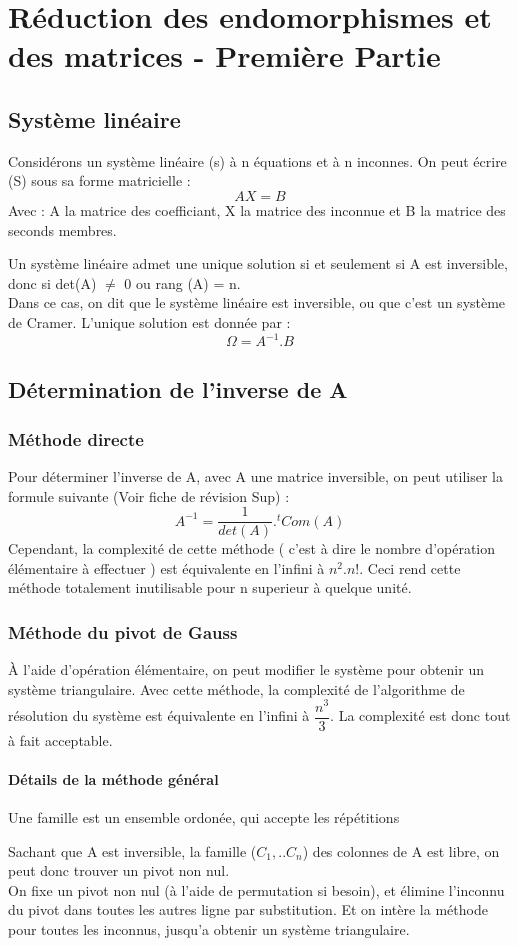 \chapter{Réduction des endomorphismes et des matrices - Première Partie}
\section{Système linéaire}
Considérons un système linéaire (s) à n équations et à n inconnes. On peut écrire (S) sous sa forme matricielle : 
$$AX = B$$
Avec : 
A la matrice des coefficiant, X la matrice des inconnue et B la matrice des seconds membres.\\
\begin{de}
Un système linéaire admet une unique solution si et seulement si A est inversible, donc si det(A) $\neq$ 0 ou rang (A) = n.\\
Dans ce cas, on dit que le système linéaire est inversible, ou que c'est un système de Cramer. L'unique solution est donnée par : 
$$\Omega = A^{-1}.B$$
\end{de}
\section{Détermination de l'inverse de A}
\subsection{Méthode directe}
Pour déterminer l'inverse de A, avec A une matrice inversible, on peut utiliser la formule suivante (Voir fiche de révision Sup) : 
$$A^{-1} = \dfrac{1}{det(A)}.^t Com(A)$$
Cependant, la complexité de cette méthode ( c'est à dire le nombre d'opération élémentaire à effectuer ) est équivalente en l'infini à $n^2.n!$. Ceci rend cette méthode totalement inutilisable pour n superieur à quelque unité.
\subsection{Méthode du pivot de Gauss}
À l'aide d'opération élémentaire, on peut modifier le système pour obtenir un système triangulaire. Avec cette méthode, la complexité de l'algorithme de résolution du système est équivalente en l'infini à $\dfrac{n^3}{3}$. La complexité est donc tout à fait acceptable.
\subsubsection{Détails de la méthode général}
\begin{de}
Une famille est un ensemble ordonée, qui accepte les répétitions
\end{de}
Sachant que A est inversible, la famille ($C_1,..C_n$) des colonnes de A est libre, on peut donc trouver un pivot non nul.\\
On fixe un pivot non nul (à l'aide de permutation si besoin), et élimine l'inconnu du pivot dans toutes les autres ligne par substitution. Et on intère la méthode pour toutes les inconnus, jusqu'a obtenir un système triangulaire.
